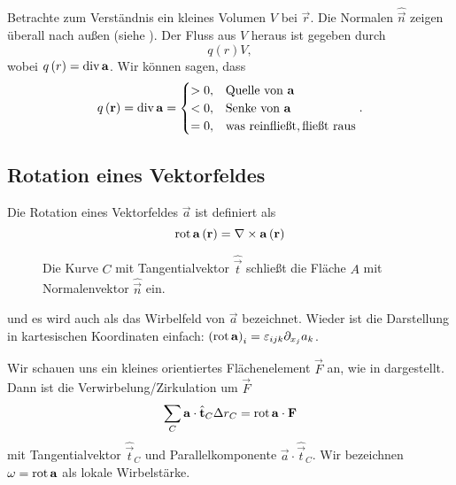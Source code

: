 Betrachte zum Verständnis ein kleines Volumen $ V$ bei $\vec {r}$. Die Normalen $\hat{\vec {n }}$ zeigen überall nach außen (siehe ). 
Der Fluss aus $V$ heraus ist gegeben durch
\begin{equation*}
	q\left(r\right) V,
\end{equation*}
wobei $q\left(r\right)=\operatorname{div} \mathbf{a}$. Wir können sagen, dass
\begin{align*}
	q\left(\mathbf{r}\right)=\operatorname{div} \mathbf{a}=\begin{cases} >0, & \text{Quelle von }\mathbf{a}                     \\
              <0, & \text{Senke von }\mathbf{a}                      \\
              =0, & \text{was reinflie\ss t},\text{flie\ss t raus}
	                                      \end{cases} .
\end{align*}



\subsection{Rotation eines Vektorfeldes}

Die Rotation eines Vektorfeldes $\vec {a}$ ist definiert als
\begin{equation*}
	\operatorname{rot} \mathbf{a}\left(\mathbf{r}\right)=\nabla \times \mathbf{a}\left(\mathbf{r}\right)
\end{equation*}


\begin{figure}[htb]
	\centering
	\tfigAreaWithCurveAndNormal
	\caption{Die Kurve $C$ mit Tangentialvektor $\hat{\vec{t}}$ schließt die Fläche $A$ mit Normalenvektor $\hat{\vec{n}}$ ein. }
	\label{fig:area_with_curve_normal}
\end{figure}

und es wird auch als das Wirbelfeld von $\vec {a}$ bezeichnet. Wieder ist die Darstellung in kartesischen Koordinaten einfach: $\left(\operatorname{rot} \mathbf{a}\right)_{i}=\varepsilon _{ijk}\partial _{{x_{j}}}a_{k}$.

Wir schauen uns ein kleines orientiertes Flächenelement $\vec F$ an, wie in  dargestellt. Dann ist die Verwirbelung/Zirkulation um $\vec F$
\begin{equation*}
	\sum _{C}\mathbf{a}\cdot \hat{\mathbf{t}}_{C}\Delta  r_{C}=\operatorname{rot} \mathbf{a}\cdot  \mathbf{F}
\end{equation*}
mit Tangentialvektor $\hat{\vec {t}}_{C}$ und Parallelkomponente $\vec {a}\cdot \hat{\vec {t}}_{C}$. Wir bezeichnen $\mathbf{\omega }=\operatorname{rot} \mathbf{a}$ als lokale Wirbelstärke.

